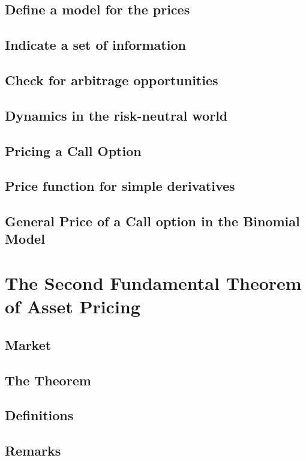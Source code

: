 \documentclass{beamer}
\numberwithin{equation}{section}
\begin{document}
\subsection{Define a model for the prices}
\subsection{Indicate a set of information}
\subsection{Check for arbitrage opportunities}
\subsection{Dynamics in the risk-neutral world}
\subsection{Pricing a Call Option}
\subsection{Price function for simple derivatives}
\subsection{General Price of a Call option in the Binomial Model}

\section{The Second Fundamental Theorem of Asset Pricing}
\subsection{Market}
\subsection{The Theorem}
\subsection{Definitions}
\subsection{Remarks}
\end{document}
